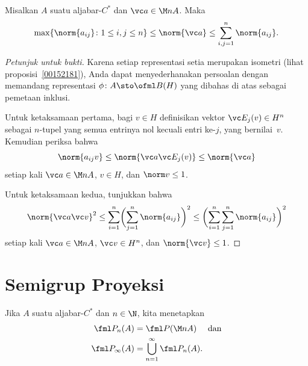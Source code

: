 \begin{prop} Misalkan $A$ suatu aljabar-$C^*$ dan $\vc a \in \M nA$. Maka
   \[ \max\{\norm{a_{ij}}\colon 1 \le i,j \le n\} \le \norm{\vc a} \le \sum_{i,j = 1}^n \norm{a_{ij}}. \]
\end{prop}

\begin{proof}[\emph{Petunjuk untuk bukti}] Karena setiap representasi setia merupakan isometri (lihat proposisi~\ref{00152181}),
Anda dapat menyederhanakan persoalan dengan memandang representasi $\phi\colon A \sto \ofml B(H)$ yang dibahas di atas sebagai
pemetaan inklusi.

Untuk ketaksamaan pertama, bagi $v \in H$ definisikan vektor $\vc E_j(v) \in H^n$ sebagai $n$-tupel
yang semua entrinya nol kecuali entri ke-$j$, yang bernilai~$v$. Kemudian periksa bahwa
   \[ \norm{a_{ij}v} \le \norm{\vc a\vc E_j(v)} \le \norm{\vc a} \]
setiap kali $\vc a \in \M nA$, $v \in H$, dan $\norm v \le 1$.

Untuk ketaksamaan kedua, tunjukkan bahwa
   \[ {\norm{\vc a\vc v}}^2 \le \sum_{i=1}^n\biggl(\sum_{j=1}^n \norm{a_{ij}}\biggr)^2 \le \biggl(\sum_{i=1}^n\sum_{j=1}^n \norm{a_{ij}}\biggr)^2 \]
setiap kali $\vc a \in \M nA$, $\vc v \in H^n$, dan $\norm{\vc v} \le 1$.    \ns
\end{proof}


























\section{Semigrup Proyeksi}

\begin{notn} Jika $A$ suatu aljabar-$C^*$ dan $n \in \N$, kita menetapkan
  \begin{align*}
       \fml P_n(A) &= \fml P(\M nA) \quad\text{ dan} \\
       \fml P_\infty(A) &= \bigcup_{n=1}^\infty \fml P_n(A).
  \end{align*}
\end{notn}

